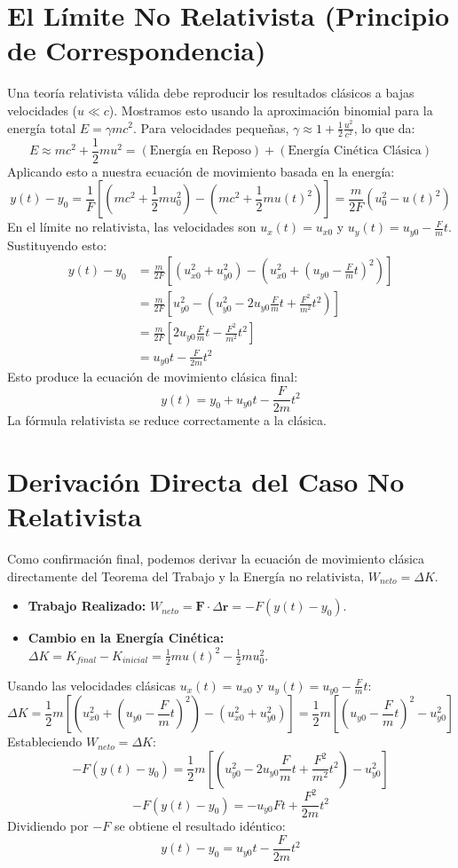 \documentclass[11pt,a4paper]{book}
\begin{document}
\section{El Límite No Relativista (Principio de Correspondencia)}
Una teoría relativista válida debe reproducir los resultados clásicos a bajas velocidades ($u \ll c$). Mostramos esto usando la aproximación binomial para la energía total $E = \gamma mc^2$. Para velocidades pequeñas, $\gamma \approx 1 + \frac{1}{2}\frac{u^2}{c^2}$, lo que da:
\[ E \approx mc^2 + \frac{1}{2}mu^2 = (\text{Energía en Reposo}) + (\text{Energía Cinética Clásica}) \]
Aplicando esto a nuestra ecuación de movimiento basada en la energía:
\[ y(t) - y_0 = \frac{1}{F} \left[ \left(mc^2 + \frac{1}{2}mu_0^2\right) - \left(mc^2 + \frac{1}{2}mu(t)^2\right) \right] = \frac{m}{2F}(u_0^2 - u(t)^2) \]
En el límite no relativista, las velocidades son $u_x(t) = u_{x0}$ y $u_y(t) = u_{y0} - \frac{F}{m}t$. Sustituyendo esto:
\begin{align*}
y(t) - y_0 &= \frac{m}{2F} \left[ (u_{x0}^2 + u_{y0}^2) - \left(u_{x0}^2 + (u_{y0} - \frac{F}{m}t)^2\right) \right] \\
&= \frac{m}{2F} \left[ u_{y0}^2 - \left(u_{y0}^2 - 2u_{y0}\frac{F}{m}t + \frac{F^2}{m^2}t^2\right) \right] \\
&= \frac{m}{2F} \left[ 2u_{y0}\frac{F}{m}t - \frac{F^2}{m^2}t^2 \right] \\
&= u_{y0}t - \frac{F}{2m}t^2
\end{align*}
Esto produce la ecuación de movimiento clásica final:
\[ \boxed{y(t) = y_0 + u_{y0}t - \frac{F}{2m}t^2} \]
La fórmula relativista se reduce correctamente a la clásica.

\section{Derivación Directa del Caso No Relativista}
Como confirmación final, podemos derivar la ecuación de movimiento clásica directamente del Teorema del Trabajo y la Energía no relativista, $W_{neto} = \Delta K$.
\begin{itemize}
    \item \textbf{Trabajo Realizado:} $W_{neto} = \boldsymbol{F} \cdot \Delta\boldsymbol{r} = -F(y(t) - y_0)$.
    \item \textbf{Cambio en la Energía Cinética:} $\Delta K = K_{final} - K_{inicial} = \frac{1}{2}mu(t)^2 - \frac{1}{2}mu_0^2$.
\end{itemize}
Usando las velocidades clásicas $u_x(t) = u_{x0}$ y $u_y(t) = u_{y0} - \frac{F}{m}t$:
\[ \Delta K = \frac{1}{2}m\left[ (u_{x0}^2 + (u_{y0}-\frac{F}{m}t)^2) - (u_{x0}^2+u_{y0}^2) \right] = \frac{1}{2}m\left[ (u_{y0}-\frac{F}{m}t)^2 - u_{y0}^2 \right] \]
Estableciendo $W_{neto} = \Delta K$:
\[ -F(y(t)-y_0) = \frac{1}{2}m\left[ (u_{y0}^2 - 2u_{y0}\frac{F}{m}t + \frac{F^2}{m^2}t^2) - u_{y0}^2 \right] \]
\[ -F(y(t)-y_0) = -u_{y0}Ft + \frac{F^2}{2m}t^2 \]
Dividiendo por $-F$ se obtiene el resultado idéntico:
\[ y(t) - y_0 = u_{y0}t - \frac{F}{2m}t^2 \]
\end{document}
